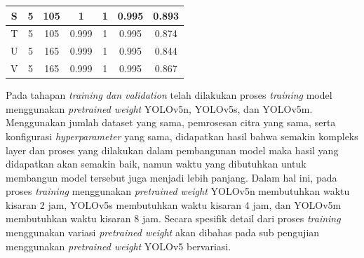 \begin{center}
\begin{longtable}[c]{|c|c|c|c|c|c|c|}
    S              & 5                          & 105                   & 1          & 1          & 0.995            & 0.893                 \\ \hline
    T              & 5                          & 105                   & 0.999      & 1          & 0.995            & 0.874                 \\ \hline
    U              & 5                          & 165                   & 0.999      & 1          & 0.995            & 0.844                 \\ \hline
    V              & 5                          & 165                   & 0.999      & 1          & 0.995            & 0.867                 \\ \hline
  \end{longtable}
\end{center}






Pada tahapan \textit{training \textnormal{dan} validation} telah dilakukan proses \textit{training} model menggunakan \textit{pretrained weight} YOLOv5n, YOLOv5s, dan YOLOv5m. Menggunakan jumlah dataset yang sama, pemrosesan citra yang sama, serta konfigurasi \textit{hyperparameter} yang sama, didapatkan hasil bahwa semakin kompleks layer dan proses yang dilakukan dalam pembangunan model maka hasil yang didapatkan akan semakin baik, namun waktu yang dibutuhkan untuk membangun model tersebut juga menjadi lebih panjang. Dalam hal ini, pada proses \textit{training} menggunakan \textit{pretrained weight} YOLOv5n membutuhkan waktu kisaran 2 jam, YOLOv5s membutuhkan waktu kisaran 4 jam, dan YOLOv5m membutuhkan waktu kisaran 8 jam. Secara spesifik detail dari proses \textit{training} menggunakan variasi \textit{pretrained weight} akan dibahas pada sub pengujian menggunakan \textit{pretrained weight} YOLOv5 bervariasi.

